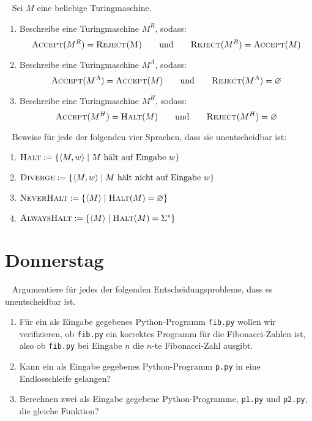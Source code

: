 \documentclass{uebung_cs}
\begin{document}
\begin{aufgabe}[Turingmaschinen]\
	Sei $M$ eine beliebige Turingmaschine.
	\begin{enumerate}
		\item Beschreibe eine Turingmaschine $M^R$, sodass:
		$$\textsc{Accept}(M^R) = \textsc{Reject(M)} \qquad \text{und} \qquad \textsc{Reject}(M^R) = \textsc{Accept}(M)$$
		
		\item Beschreibe eine Turingmaschine $M^A$, sodass:
		$$\textsc{Accept}(M^A) = \textsc{Accept}(M) \qquad \text{und} \qquad \textsc{Reject}(M^A) = \varnothing$$
		
		\item Beschreibe eine Turingmaschine $M^H$, sodass:
		$$\textsc{Accept}(M^H) = \textsc{Halt}(M) \qquad \text{und} \qquad \textsc{Reject}(M^H) = \varnothing$$
	\end{enumerate}
\end{aufgabe}

\begin{aufgabe}[Entscheidbarkeit I]\
	Beweise für jede der folgenden vier Sprachen, dass sie unentscheidbar ist:
	\begin{enumerate}
		\item $\textsc{Halt} := \{\langle M,w\rangle \;|\; M \text{ hält auf Eingabe } w\}$
		\item $\textsc{Diverge} := \{\langle M,w\rangle \;|\; M \text{ hält nicht auf Eingabe } w\}$
		\item $\textsc{NeverHalt} := \{\langle M \rangle \;|\; \textsc{Halt}(M) = \varnothing\}$
		\item $\textsc{AlwaysHalt} := \{\langle M \rangle \;|\; \textsc{Halt}(M) = \Sigma^{\ast}\}$
	\end{enumerate}
\end{aufgabe}

\section*{Donnerstag}

\begin{aufgabe}[Entscheidbarkeit II]\
	Argumentiere für jedes der folgenden Entscheidungsprobleme, dass es unentscheidbar ist.
	\begin{enumerate}
		\item Für ein als Eingabe gegebenes Python-Programm \texttt{fib.py} wollen wir verifizieren, ob \texttt{fib.py} ein korrektes Programm für die Fibonacci-Zahlen ist, also ob \texttt{fib.py} bei Eingabe $n$ die $n$-te Fibonacci-Zahl ausgibt.
		\item Kann ein als Eingabe gegebenes Python-Programm \texttt{p.py} in eine Endlosschleife gelangen?
		\item Berechnen zwei als Eingabe gegebene Python-Programme, \texttt{p1.py} und \texttt{p2.py}, die gleiche Funktion?
	\end{enumerate}
\end{aufgabe}
\end{document}
